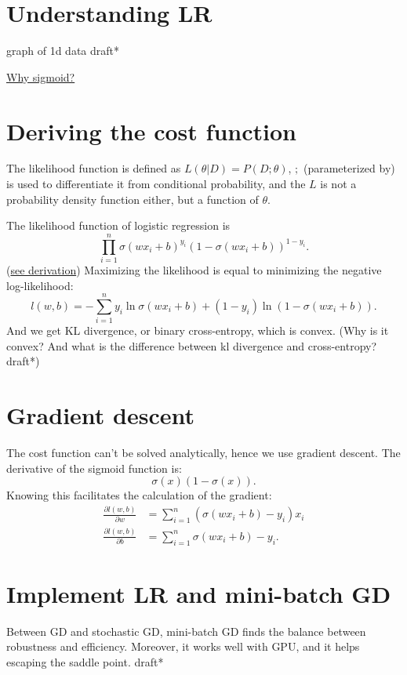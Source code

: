 \documentclass{report}
\begin{document}
  \section{Understanding LR}
  graph of 1d data draft*

  \href{https://towardsdatascience.com/why-sigmoid-a-probabilistic-perspective-42751d82686}{Why sigmoid?}
  \section{Deriving the cost function}
  The likelihood function is defined as $L\left( \theta|D \right) = P\left( D;\theta\right)  $, $;$ (parameterized by) is used to differentiate it from conditional probability, and the $L$ is not a probability density function either, but a function of $\theta$. 

The likelihood function of logistic regression is 
\begin{displaymath}
\prod_{i=1}^{n} {\sigma\left( wx_{i} + b \right)^{y_{i}}\left( 1 - \sigma\left( wx_{i} + b\right)\right)^{1 - y_{i} }}.
\end{displaymath} (\href{https://zstevenwu.com/courses/s20/csci5525/resources/slides/lecture05.pdf}{see derivation})
Maximizing the likelihood is equal to minimizing the negative log-likelihood: \[
	l\left( w, b \right) = -\sum_{i=1}^{n} y_{i} \ln \sigma \left(wx_{i} + b\right) + \left( 1 - y_{i} \right) \ln \left(1 - \sigma\left(wx_{i} + b\right)\right)
.\] 
And we get KL divergence, or binary cross-entropy, which is convex. (Why is it convex? And what is the difference between kl divergence and cross-entropy? draft*)
  \section{Gradient descent}
  The cost function can't be solved analytically, hence we use gradient descent.
  The derivative of the sigmoid function is:
  \[
  \sigma(x)(1 - \sigma(x))
  .\] 
  Knowing this facilitates the calculation of the gradient: 
  \begin{align*}
	  \frac{\partial l(w, b)}{\partial w} & = \sum_{i = 1}^{n} (\sigma(wx_i + b) - y_i) x_i \\
\frac{\partial l(w, b)}{\partial b} & = \sum_{i = 1}^{n} \sigma(wx_i + b) - y_i. 
  \end{align*}
  \section{Implement LR and mini-batch GD}
  Between GD and stochastic GD, mini-batch GD finds the balance between robustness and efficiency. Moreover, it works well with GPU, and it helps escaping the saddle point.
  draft*
\end{document}
